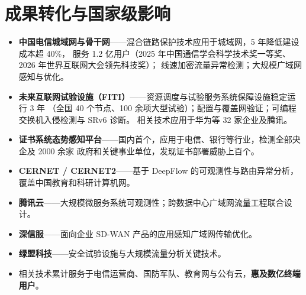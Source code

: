 \documentclass[11pt]{article}
\begin{document}
\section{成果转化与国家级影响}
\begin{itemize}
  \item \textbf{中国电信城域网与骨干网}——混合链路保护技术应用于城域网，5 年降低建设成本超 40\%，
        服务 1.2 亿用户（2025 年中国通信学会科学技术奖一等奖、2026 年世界互联网大会领先科技奖）；
        线速加密流量异常检测；大规模广域网感知与优化。
  \item \textbf{未来互联网试验设施（FITI）}——资源调度与试验服务系统保障设施稳定运行 3 年
        （全国 40 个节点、100 余项大型试验）；配置与覆盖网验证；可编程交换机入侵检测与 SRv6 诊断。
        相关技术应用于华为等 32 家企业及腾讯。
  \item \textbf{证书系统态势感知平台}——国内首个，应用于电信、银行等行业，检测全部央企及 2000 余家
        政府和关键事业单位，发现证书部署威胁上百个。
  \item \textbf{CERNET / CERNET2}——基于 DeepFlow 的可观测性与路由异常分析，
        覆盖中国教育和科研计算机网。
  \item \textbf{腾讯云}——大规模微服务系统可观测性；跨数据中心广域网流量工程联合设计。
  \item \textbf{深信服}——面向企业 SD-WAN 产品的应用感知广域网传输优化。
  \item \textbf{绿盟科技}——安全试验设施与大规模流量分析关键技术。
  \item 相关技术累计服务于电信运营商、国防军队、教育网与公有云，\textbf{惠及数亿终端用户}。
\end{itemize}

\end{document}
